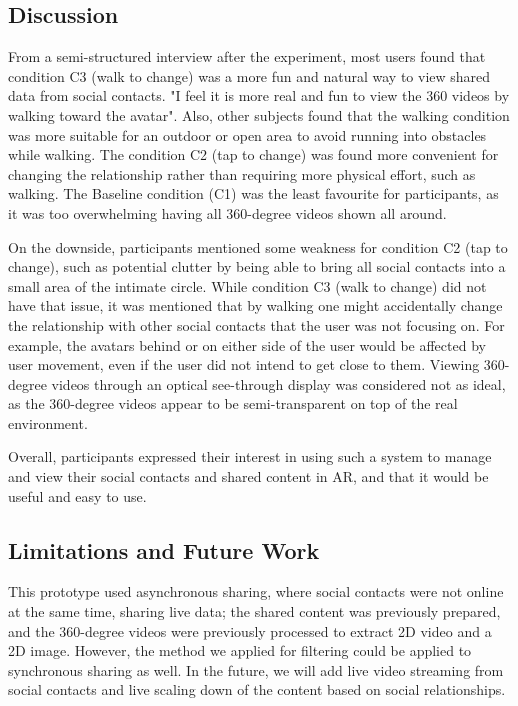 \subsection{Discussion}

From a semi-structured interview after the experiment, most users found that condition C3 (walk to change) was a more fun and natural way to view shared data from social contacts. "I feel it is more real and fun to view the 360 videos by walking toward the avatar". Also, other subjects found that the walking condition was more suitable for an outdoor or open area to avoid running into obstacles while walking. The condition C2 (tap to change) was found more convenient for changing the relationship rather than requiring more physical effort, such as walking. The Baseline condition (C1) was the least favourite for participants, as it was too overwhelming having all 360-degree videos shown all around. 

On the downside, participants mentioned some weakness for condition C2 (tap to change), such as potential clutter by being able to bring all social contacts into a small area of the intimate circle. While condition C3 (walk to change) did not have that issue, it was mentioned that by walking one might accidentally change the relationship with other social contacts that the user was not focusing on. For example, the avatars behind or on either side of the user would be affected by user movement, even if the user did not intend to get close to them. Viewing 360-degree videos through an optical see-through display was considered not as ideal, as the 360-degree videos appear to be semi-transparent on top of the real environment.

Overall, participants expressed their interest in using such a system to manage and view their social contacts and shared content in AR, and that it would be useful and easy to use. 

\subsection{Limitations and Future Work}

This prototype used asynchronous sharing, where social contacts were not online at the same time, sharing live data; the shared content was previously prepared, and the 360-degree videos were previously processed to extract 2D video and a 2D image. However, the method we applied for filtering could be applied to synchronous sharing as well. In the future, we will add live video streaming from social contacts and live scaling down of the content based on social relationships. 

